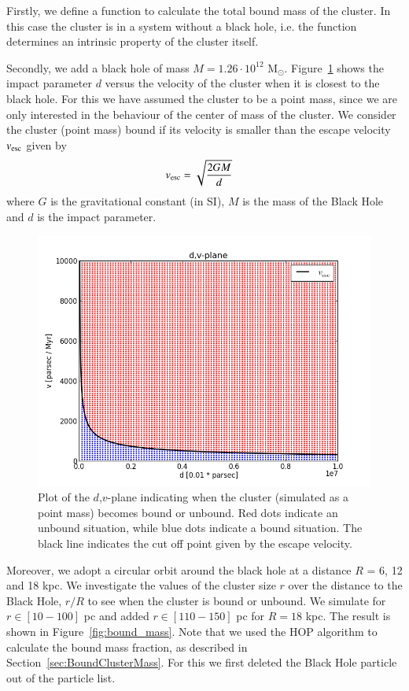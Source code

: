\documentclass{aa}
\newcommand{\Sun}[0]{\ensuremath{_{\odot}}}
\begin{document}
Firstly, we define a function to calculate the total bound mass of the cluster. In this case the cluster is in a system without a black hole, i.e. the function determines an intrinsic property of the cluster itself. 

Secondly, we add a black hole of mass $M = 1.26 \cdot 10^{12}$ M\Sun. Figure~\ref{fig:dvplane} shows the impact parameter $d$ versus the velocity of the cluster when it is closest to the black hole. For this we have assumed the cluster to be a point mass, since we are only interested in the behaviour of the center of mass of the cluster. We consider the cluster (point mass) bound if its velocity is smaller than the escape velocity $v_{\rm esc}$ given by \begin{eqnarray} v_{\rm esc} &= \sqrt{\frac{2 G M}{d}} \label{eq:vesc} \end{eqnarray} where $G$ is the gravitational constant (in SI), $M$ is the mass of the Black Hole and $d$ is the impact parameter.

   \begin{figure}
   \centering
   \includegraphics[width=\hsize]{img/dv_plot.png}
      \caption{Plot of the $d$,$v$-plane indicating when the cluster (simulated as a point mass) becomes bound or unbound.
      		   Red dots indicate an unbound situation, while blue dots indicate a bound situation. The black line indicates the cut off point given by
		   the escape velocity.
              }
         \label{fig:dvplane}
   \end{figure}


Moreover, we adopt a circular orbit around the black hole at a distance $R$ = 6, 12 and 18 kpc. We investigate the values of the cluster size $r$ over the distance to the Black Hole, $r/R$ to see when the cluster is bound or unbound. We simulate for $r \in [10 - 100]$ pc and added $r \in [110 - 150]$ pc for $R = 18$ kpc. The result is shown in Figure~\ref{fig:bound_mass}. Note that we used the HOP algorithm to calculate the bound mass fraction, as described in Section~\ref{sec:BoundClusterMass}. For this we first deleted the Black Hole particle out of the particle list.
\end{document}
